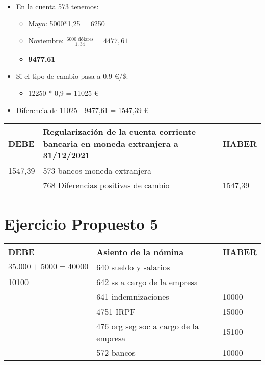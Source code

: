 \documentclass[a4paper,12pt]{article}
\begin{document}
\begin{itemize}
    \item En la cuenta 573 tenemos:
    \begin{itemize}
        \item Mayo: 5000*1,25 = 6250
        \item Noviembre: $\frac{6000\text{ dólares}}{1,34}=4477,61$ 
        \item \textbf{9477,61}
    \end{itemize}
    \item Si el tipo de cambio pasa a 0,9 \euro/\$:
    \begin{itemize}
        \item 12250 * 0,9 = 11025 \euro
    \end{itemize}
    \item Diferencia de 11025 - 9477,61 = 1547,39 \euro
\end{itemize}

\begin{table}[H]
            \centering
            \begin{tabular}{|p{3cm}|p{6cm}|p{3cm}|}
            \hline
            \textbf{DEBE} & \textbf{Regularización de la cuenta corriente bancaria en moneda extranjera a 31/12/2021} & \textbf{HABER} \\
            \hline
            1547,39 & 573 bancos moneda extranjera & \\
            \hline
            & 768 Diferencias positivas de cambio & 1547,39\\
            \hline
            \end{tabular}
            \end{table}  



\section{Ejercicio Propuesto 5}

\begin{table}[H]
    \centering
    \begin{tabular}{|p{3cm}|p{6cm}|p{3cm}|}
    \hline
    \textbf{DEBE} & \textbf{Asiento de la nómina} & \textbf{HABER} \\
    \hline
    $35.000 + 5000  = 40000$& 640 sueldo y salarios& \\
    \hline
    10100& 642 ss a cargo de la empresa & \\
    \hline
    & 641 indemnizaciones &10000 \\
    \hline
    & 4751 IRPF & 15000 \\
    \hline
    & 476 org seg soc a cargo de la empresa& 15100\\
    \hline
    & 572 bancos & 10000\\
    \hline
    \end{tabular}
\end{table}
\end{document}
